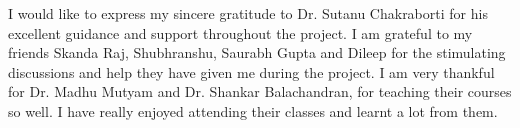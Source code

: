 \acknowledgements

I would like to express my sincere gratitude to Dr. Sutanu Chakraborti for his excellent guidance and support throughout the project.
I am grateful to my friends Skanda Raj, Shubhranshu, Saurabh Gupta and Dileep for the stimulating discussions and help they have given me during the project.
I am very thankful for Dr. Madhu Mutyam and Dr. Shankar Balachandran, for teaching their courses so well.
I have really enjoyed attending their classes and learnt a lot from them.

%
